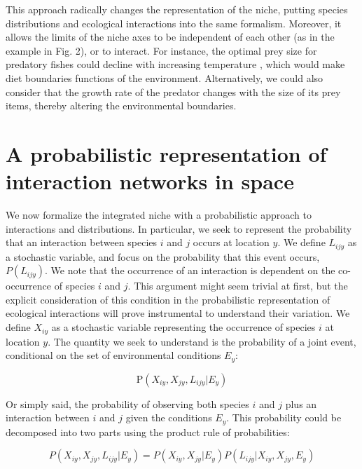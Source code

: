 \documentclass[12pt]{article}
\begin{document}
This approach radically changes the representation of the niche, putting species
distributions and ecological interactions into the same formalism.
Moreover, it allows the limits of the niche axes to be independent of each other (as in the
example in Fig. 2), or to interact. For instance, the optimal
prey size for predatory fishes could decline with increasing temperature
\citep{Lelong2015}, which would make diet boundaries functions of the
environment. Alternatively, we could also consider that the growth rate
of the predator changes with the size of its prey items, thereby altering the
environmental boundaries.

\section*{A probabilistic representation of interaction networks in space}

We now formalize the integrated niche with a probabilistic approach to
interactions and distributions. In particular, we seek to represent the probability that an
interaction between species $i$ and $j$ occurs at location $y$. We define
$L_{ijy}$ as a stochastic variable, and focus on the probability that
this event occurs, $P(L_{ijy})$. We note that the occurrence of an interaction is dependent
on the co-occurrence of species $i$ and $j$. This argument might seem trivial
at first, but the explicit consideration of this condition in the
probabilistic representation of ecological interactions will prove instrumental
to understand their variation. We define $X_{iy}$ as a stochastic variable
representing the occurrence of species $i$ at location $y$. The quantity we seek to
understand is the probability of a joint event, conditional on the set of
environmental conditions $E_y$:

\begin{equation}
	\text{P}(X_{iy},X_{jy},L_{ijy}|E_y)
\end{equation}

Or simply said, the probability of observing both species $i$ and $j$ plus an
interaction between $i$ and $j$ given the conditions $E_y$. This probability
could be decomposed into two parts using the product rule of probabilities:

\begin{equation}
	P(X_{iy},X_{jy},L_{ijy}|E_y)=P(X_{iy},X_{jy}|E_y)P(L_{ijy}|X_{iy},X_{jy},E_y)
\end{equation}
\end{document}
